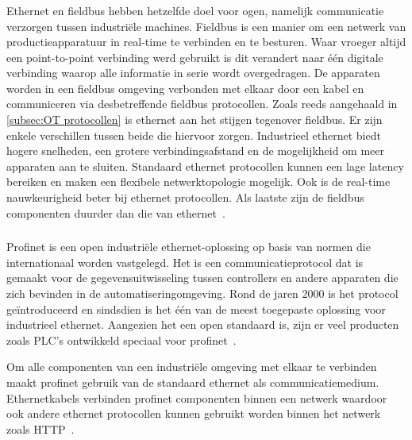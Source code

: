 \subsubsection{}
\label{subsubsec:Verschil ethernet en fieldbus+}
Ethernet en fieldbus hebben hetzelfde doel voor ogen, namelijk communicatie verzorgen tussen industriële machines. Fieldbus is een manier om een netwerk van productieapparatuur in real-time te verbinden en te besturen. Waar vroeger altijd een point-to-point verbinding werd gebruikt is dit verandert naar één digitale verbinding waarop alle informatie in serie wordt overgedragen. De apparaten worden in een fieldbus omgeving verbonden met elkaar door een kabel en communiceren via desbetreffende fieldbus protocollen. Zoals reeds aangehaald in \ref{subsec:OT protocollen} is ethernet aan het stijgen tegenover fieldbus. Er zijn enkele verschillen tussen beide die hiervoor zorgen. Industrieel ethernet biedt hogere snelheden, een grotere verbindingsafstand en de mogelijkheid om meer apparaten aan te sluiten. Standaard ethernet protocollen kunnen een lage latency bereiken en maken een flexibele netwerktopologie mogelijk. Ook is de real-time nauwkeurigheid beter bij ethernet protocollen. Als laatste zijn de fieldbus componenten duurder dan die van ethernet~\autocite{Chemigraphic2019}.



\subsubsection{}
\label{subsubsec:Profinet}
Profinet is een open industriële ethernet-oplossing op basis van normen die internationaal worden vastgelegd. Het is een communicatieprotocol dat is gemaakt voor de gegevensuitwisseling tussen controllers en andere apparaten die zich bevinden in de automatiseringomgeving. Rond de jaren 2000 is het protocol geïntroduceerd en sindsdien is het één van de meest toegepaste oplossing voor industrieel ethernet. Aangezien het een open standaard is, zijn er veel producten zoals PLC's ontwikkeld speciaal voor profinet~\autocite{Nelly2021}.

Om alle componenten van een industriële omgeving met elkaar te verbinden maakt profinet gebruik van de standaard ethernet als communicatiemedium. Ethernetkabels verbinden profinet componenten binnen een netwerk waardoor ook andere ethernet protocollen kunnen gebruikt worden binnen het netwerk zoals HTTP~\autocite{Nelly2021}.

